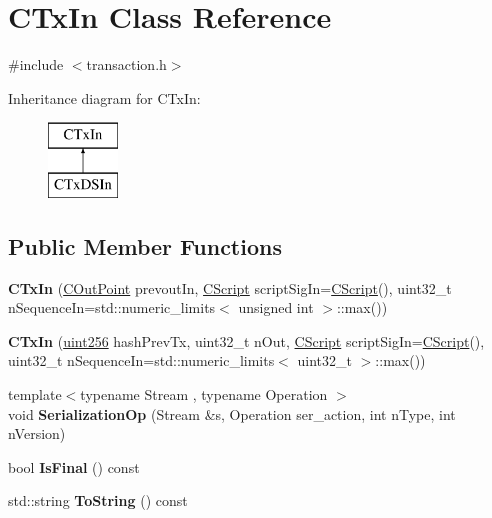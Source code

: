 \hypertarget{class_c_tx_in}{}\section{C\+Tx\+In Class Reference}
\label{class_c_tx_in}


{\ttfamily \#include $<$transaction.\+h$>$}

Inheritance diagram for C\+Tx\+In\+:\begin{figure}[H]
\begin{center}
\leavevmode
\includegraphics[height=2.000000cm]{class_c_tx_in}
\end{center}
\end{figure}
\subsection*{Public Member Functions}
\begin{DoxyCompactItemize}
\item 
\mbox{\label{class_c_tx_in_a200599abad3a0f0b92edbf74c4b2ab5d}} 
{\bfseries C\+Tx\+In} (\mbox{\hyperlink{class_c_out_point}{C\+Out\+Point}} prevout\+In, \mbox{\hyperlink{class_c_script}{C\+Script}} script\+Sig\+In=\mbox{\hyperlink{class_c_script}{C\+Script}}(), uint32\+\_\+t n\+Sequence\+In=std\+::numeric\+\_\+limits$<$ unsigned int $>$\+::max())
\item 
\mbox{\label{class_c_tx_in_a09a783aad555111a108f09ac79361c4a}} 
{\bfseries C\+Tx\+In} (\mbox{\hyperlink{classuint256}{uint256}} hash\+Prev\+Tx, uint32\+\_\+t n\+Out, \mbox{\hyperlink{class_c_script}{C\+Script}} script\+Sig\+In=\mbox{\hyperlink{class_c_script}{C\+Script}}(), uint32\+\_\+t n\+Sequence\+In=std\+::numeric\+\_\+limits$<$ uint32\+\_\+t $>$\+::max())
\item 
\mbox{\label{class_c_tx_in_a3d23c5264c6d93ecf3cf65dd13c55db3}} 
{\footnotesize template$<$typename Stream , typename Operation $>$ }\\void {\bfseries Serialization\+Op} (Stream \&s, Operation ser\+\_\+action, int n\+Type, int n\+Version)
\item 
\mbox{\label{class_c_tx_in_ae6629ccc2720f2b772b0cc2d7f3fe42b}} 
bool {\bfseries Is\+Final} () const
\item 
\mbox{\label{class_c_tx_in_a9f3dcba8a979ca7007448f8ad1d3c4c1}} 
std\+::string {\bfseries To\+String} () const
\end{DoxyCompactItemize}
